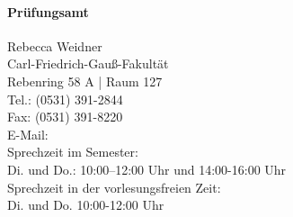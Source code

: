 	\noindent\begin{minipage}{\columnwidth}
	\paragraph{Prüfungsamt}
	Rebecca Weidner\\
	Carl-Friedrich-Gauß-Fakultät\\
	Rebenring 58 A | Raum 127\\
	Tel.: (0531) 391-2844\\
	Fax: (0531) 391-8220\\
	E-Mail: \\
	Sprechzeit im Semester:\\
	Di. und Do.: 10:00–12:00 Uhr und 14:00-16:00 Uhr\\
	Sprechzeit in der vorlesungsfreien Zeit:\\
	Di. und Do. 10:00-12:00 Uhr
	\end{minipage}

